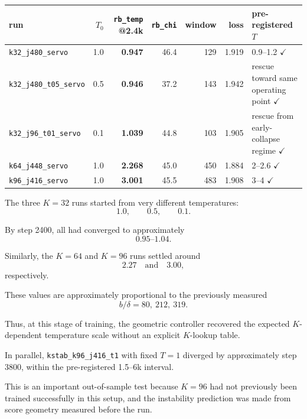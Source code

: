 \documentclass[11pt,a4paper]{article}
\newcommand{\code}[1]{\texttt{#1}}
\begin{document}
\begin{center}\small
\begin{tabular}{lrrrrrl}
\toprule
run & \(T_0\) & \code{rb\_temp} @2.4k & \code{rb\_chi} & window & loss &
pre-registered \(T\) \\
\midrule

\code{k32\_j480\_servo}
&
1.0 & \textbf{0.947} & 46.4 & 129 & 1.919 &
0.9--1.2 \(\checkmark\)
\\

\code{k32\_j480\_t05\_servo}
&
0.5 & \textbf{0.946} & 37.2 & 143 & 1.942 &
rescue toward same operating point \(\checkmark\)
\\

\code{k32\_j96\_t01\_servo}
&
0.1 & \textbf{1.039} & 44.8 & 103 & 1.905 &
rescue from early-collapse regime \(\checkmark\)
\\

\code{k64\_j448\_servo}
&
1.0 & \textbf{2.268} & 45.0 & 450 & 1.884 &
2--2.6 \(\checkmark\)
\\

\code{k96\_j416\_servo}
&
1.0 & \textbf{3.001} & 45.5 & 483 & 1.908 &
3--4 \(\checkmark\)
\\

\bottomrule
\end{tabular}
\end{center}

The three \(K=32\) runs started from very different temperatures:
\[
1.0,\qquad0.5,\qquad0.1.
\]

By step 2400, all had converged to approximately
\[
0.95\text{--}1.04.
\]

Similarly, the \(K=64\) and \(K=96\) runs settled around
\[
2.27
\quad\text{and}\quad
3.00,
\]
respectively.

These values are approximately proportional to the previously measured
\[
b/\delta
=
80,\ 212,\ 319.
\]

Thus, at this stage of training, the geometric controller recovered the
expected \(K\)-dependent temperature scale without an explicit \(K\)-lookup
table.

In parallel,
\code{kstab\_k96\_j416\_t1}
with fixed \(T=1\) diverged by approximately step 3800, within the
pre-registered 1.5--6k interval.

This is an important out-of-sample test because \(K=96\) had not previously
been trained successfully in this setup, and the instability prediction was
made from score geometry measured before the run.


\end{document}

